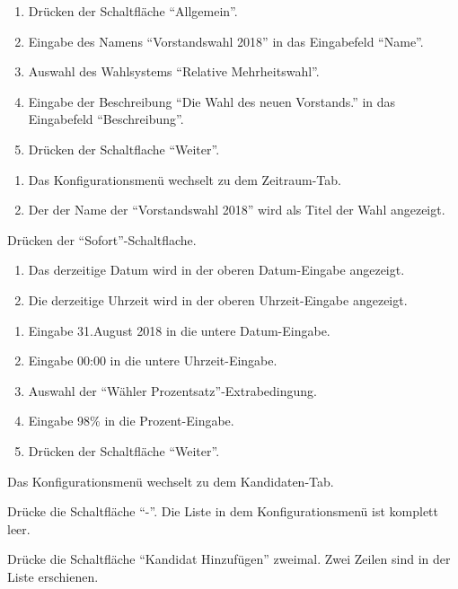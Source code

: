 \documentclass[parskip=full]{scrartcl}
\begin{document}
\teststep{}
		{\begin{enumerate}
				\item Drücken der Schaltfläche \enquote{Allgemein}.
				\item Eingabe des Namens \enquote{Vorstandswahl 2018} in das Eingabefeld \enquote{Name}.
				\item Auswahl des Wahlsystems \enquote{Relative Mehrheitswahl}.
				\item Eingabe der Beschreibung \enquote{Die Wahl des neuen Vorstands.} in das Eingabefeld \enquote{Beschreibung}.
				\item Drücken der Schaltflache \enquote{Weiter}.
		\end{enumerate}}
		{\begin{enumerate}
				\item Das Konfigurationsmenü wechselt zu dem Zeitraum-Tab.
				\item Der der Name der \enquote{Vorstandswahl 2018} wird als Titel der Wahl angezeigt.
		\end{enumerate}}

\teststep{}
		{Drücken der \enquote{Sofort}-Schaltflache.}
		{\begin{enumerate}
				\item Das derzeitige Datum wird in der oberen Datum-Eingabe angezeigt.
				\item Die derzeitige Uhrzeit wird in der oberen Uhrzeit-Eingabe angezeigt.
		\end{enumerate}}
	
\teststep{}
		{\begin{enumerate}
				\item Eingabe 31.August 2018 in die untere Datum-Eingabe.
				\item Eingabe 00:00 in die untere Uhrzeit-Eingabe.
				\item Auswahl der \enquote{Wähler Prozentsatz}-Extrabedingung.
				\item Eingabe 98\% in die Prozent-Eingabe.
				\item Drücken der Schaltfläche \enquote{Weiter}.
		\end{enumerate}}
		{Das Konfigurationsmenü wechselt zu dem Kandidaten-Tab.}

\teststep{}
		{Drücke die Schaltfläche \enquote{-}.}
		{Die Liste in dem Konfigurationsmenü ist komplett leer.}
		
\teststep{}
		{Drücke die Schaltfläche \enquote{Kandidat Hinzufügen} zweimal.}
		{Zwei Zeilen sind in der Liste erschienen.}
	
\end{document}
